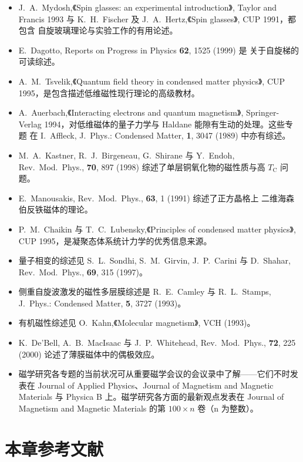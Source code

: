 \begin{itemize}[itemsep=0.2em]
\item J.~A.~Mydosh,《Spin glasses: an experimental introduction》, Taylor and
Francis 1993 与 K.~H.~Fischer 及 J.~A.~Hertz,《Spin glasses》, CUP 1991，都包含
自旋玻璃理论与实验工作的有用论述。
\item E.~Dagotto, Reports on Progress in Physics \textbf{62}, 1525 (1999) 是
关于自旋梯的可读综述。
\item A.~M.~Tsvelik,《Quantum field theory in condensed matter physics》, CUP
1995，是包含描述低维磁性现行理论的高级教材。
\item A.~Auerbach,《Interacting electrons and quantum magnetism》,
Springer-Verlag 1994，对低维磁体的量子力学与 Haldane 能隙有生动的处理。这些专题
在 I.~Affleck, J.~Phys.: Condensed Matter, \textbf{1}, 3047 (1989) 中亦有综述。
\item M.~A.~Kastner, R.~J.~Birgeneau, G.~Shirane 与 Y.~Endoh, Rev.~Mod.~Phys.,
\textbf{70}, 897 (1998) 综述了单层铜氧化物的磁性质与高 $T_{\mathrm{C}}$ 问题。
\item E.~Manousakis, Rev.~Mod.~Phys., \textbf{63}, 1 (1991) 综述了正方晶格上
二维海森伯反铁磁体的理论。
\item P.~M.~Chaikin 与 T.~C.~Lubensky,《Principles of condensed matter
physics》, CUP 1995，是凝聚态体系统计力学的优秀信息来源。
\item 量子相变的综述见 S.~L.~Sondhi, S.~M.~Girvin, J.~P.~Carini 与 D.~Shahar,
Rev.~Mod.~Phys., \textbf{69}, 315 (1997)。
\item 侧重自旋波激发的磁性多层膜综述是 R.~E.~Camley 与 R.~L.~Stamps, J.~Phys.:
Condensed Matter, \textbf{5}, 3727 (1993)。
\item 有机磁性综述见 O.~Kahn,《Molecular magnetism》, VCH (1993)。
\item K.~De'Bell, A.~B.~MacIsaac 与 J.~P.~Whitehead, Rev.~Mod.~Phys., \textbf{72},
225 (2000) 论述了薄膜磁体中的偶极效应。
\item 磁学研究各专题的当前状况可从重要磁学会议的会议录中了解——它们不时发表在
Journal of Applied Physics、Journal of Magnetism and Magnetic Materials 与
Physica B 上。磁学研究各方面的最新观点发表在 Journal of Magnetism and Magnetic
Materials 的第 $100\times n$ 卷（n 为整数）。
\end{itemize}

\section*{本章参考文献}

